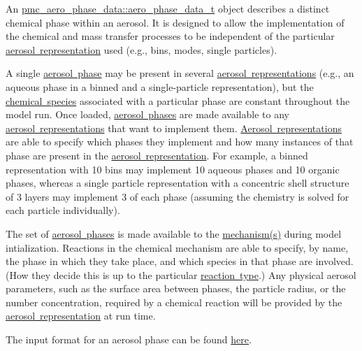 An {\ttfamily \mbox{\hyperlink{structpmc__aero__phase__data_1_1aero__phase__data__t}{pmc\+\_\+aero\+\_\+phase\+\_\+data\+::aero\+\_\+phase\+\_\+data\+\_\+t}}} object describes a distinct chemical phase within an aerosol. It is designed to allow the implementation of the chemical and mass transfer processes to be independent of the particular \mbox{\hyperlink{phlex_aero_rep}{aerosol representation}} used (e.\+g., bins, modes, single particles).

A single \mbox{\hyperlink{phlex_aero_phase}{aerosol phase}} may be present in several \mbox{\hyperlink{phlex_aero_rep}{aerosol representations}} (e.\+g., an aqueous phase in a binned and a single-\/particle representation), but the \mbox{\hyperlink{phlex_species}{chemical species}} associated with a particular phase are constant throughout the model run. Once loaded, \mbox{\hyperlink{phlex_aero_phase}{aerosol phases}} are made available to any \mbox{\hyperlink{input_format_aero_rep}{aerosol representations}} that want to implement them. \mbox{\hyperlink{phlex_aero_rep}{Aerosol representations}} are able to specify which phases they implement and how many instances of that phase are present in the \mbox{\hyperlink{phlex_aero_rep}{aerosol representation}}. For example, a binned representation with 10 bins may implement 10 aqueous phases and 10 organic phases, whereas a single particle representation with a concentric shell structure of 3 layers may implement 3 of each phase (assuming the chemistry is solved for each particle individually).

The set of \mbox{\hyperlink{phlex_aero_phase}{aerosol phases}} is made available to the \mbox{\hyperlink{phlex_mechanism}{mechanism(s)}} during model intialization. Reactions in the chemical mechanism are able to specify, by name, the phase in which they take place, and which species in that phase are involved. (How they decide this is up to the particular \mbox{\hyperlink{phlex_rxn}{reaction type}}.) Any physical aerosol parameters, such as the surface area between phases, the particle radius, or the number concentration, required by a chemical reaction will be provided by the \mbox{\hyperlink{phlex_aero_rep}{aerosol representation}} at run time.

The input format for an aerosol phase can be found \mbox{\hyperlink{input_format_aero_phase}{here}}. 